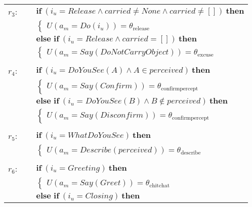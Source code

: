\begin{footnotesize}
\begin{longtable}{p{2cm}l}
$r_{3}$: \ \ & $ \textbf{if} \ (\mathit{i_u}\!=\!\mathit{Release} \land \mathit{carried}\!\neq\!\mathit{None} \land \mathit{carried}\!\neq\!\mathit{[]}) \ \textbf{then} $ \\
 & \;\;\;\;\; $ \begin{cases}U(\mathit{a_m}\!=\!\mathit{Do({i_u})})\!=\!\theta_{\mathrm{release}} \end{cases}$ \vspace{1mm} \\ & $ \textbf{else if} \ (\mathit{i_u}\!=\!\mathit{Release} \land \mathit{carried}\!=\!\mathit{[]}) \ \textbf{then}$ \\
& \;\;\;\;\; $ \begin{cases}U(\mathit{a_m}\!=\!\mathit{Say(DoNotCarryObject)})\!=\!\theta_{\mathrm{excuse}} \end{cases}$ \\ \\[-1mm]
$r_{4}$: \ \ & $ \textbf{if} \ (\mathit{i_u}\!=\!\mathit{DoYouSee({A})} \land \mathit{{A}}\!\in\!\mathit{perceived}) \ \textbf{then} $ \\
 & \;\;\;\;\; $ \begin{cases}U(\mathit{a_m}\!=\!\mathit{Say(Confirm)})\!=\!\theta_{\mathrm{confirmpercept}} \end{cases}$ \vspace{1mm} \\ & $ \textbf{else if} \ (\mathit{i_u}\!=\!\mathit{DoYouSee({B})} \land \mathit{{B}}\!\notin\!\mathit{perceived}) \ \textbf{then}$ \\
& \;\;\;\;\; $ \begin{cases}U(\mathit{a_m}\!=\!\mathit{Say(Disconfirm)})\!=\!\theta_{\mathrm{confirmpercept}} \end{cases}$ \\ \\[-1mm]
$r_{5}$: \ \ & $ \textbf{if} \ (\mathit{i_u}\!=\!\mathit{WhatDoYouSee}) \ \textbf{then} $ \\
 & \;\;\;\;\; $ \begin{cases}U(\mathit{a_m}\!=\!\mathit{Describe({perceived})})\!=\!\theta_{\mathrm{describe}} \end{cases}$ \\ \\[-1mm]
$r_{6}$: \ \ & $ \textbf{if} \ (\mathit{i_u}\!=\!\mathit{Greeting}) \ \textbf{then} $ \\
 & \;\;\;\;\; $ \begin{cases}U(\mathit{a_m}\!=\!\mathit{Say(Greet)})\!=\!\theta_{\mathrm{chitchat}} \end{cases}$ \vspace{1mm} \\ & $ \textbf{else if} \ (\mathit{i_u}\!=\!\mathit{Closing}) \ \textbf{then}$ \\

\end{longtable}
\end{footnotesize}
